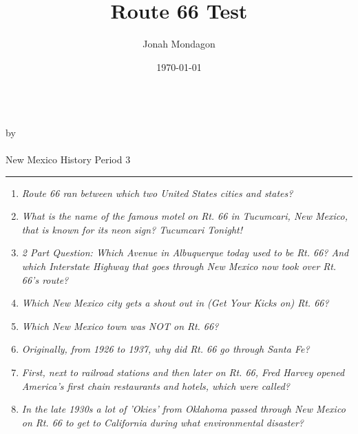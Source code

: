 \documentclass[12pt]{article}
\newcommand{\PutTitle}[1]
{
    \begin{center}
        {\huge\bfseries\thetitle}\\
        by \theauthor\\
        \thedate\\
        #1
    \end{center}
    \hrule
}
\begin{document}
\title{Route 66 Test}
\author{Jonah Mondagon}
\date{\today}
\PutTitle{New Mexico History Period 3}

\pagestyle{headings}

\doublespacing

\begin{enumerate}
    \item{\textit{Route 66 ran between which two United States cities and states?}}
        \begin{addmargin}[24pt]{0in}
        \end{addmargin}
    \item{\textit{What is the name of the famous motel on Rt. 66 in Tucumcari, New Mexico, that is known for its neon sign? Tucumcari Tonight!}}
        \begin{addmargin}[24pt]{0in}
        \end{addmargin}
    \item{\textit{2 Part Question: Which Avenue in Albuquerque today used to be Rt. 66? And which Interstate Highway that goes through New Mexico now took over Rt. 66's route?}}
        \begin{addmargin}[24pt]{0in}
        \end{addmargin}
    \item{\textit{Which New Mexico city gets a shout out in (Get Your Kicks on) Rt. 66?}}
        \begin{addmargin}[24pt]{0in}
        \end{addmargin}
    \item{\textit{Which New Mexico town was NOT on Rt. 66?}}
        \begin{addmargin}[24pt]{0in}
        \end{addmargin}
    \item{\textit{Originally, from 1926 to 1937, why did Rt. 66 go through Santa Fe?}}
        \begin{addmargin}[24pt]{0in}
        \end{addmargin}
    \item{\textit{First, next to railroad stations and then later on Rt. 66, Fred Harvey opened America's first chain restaurants and hotels, which were called?}}
        \begin{addmargin}[24pt]{0in}
        \end{addmargin}
    \item{\textit{In the late 1930s a lot of 'Okies' from Oklahoma passed through New Mexico on Rt. 66 to get to California during what environmental disaster?}}
        \begin{addmargin}[24pt]{0in}

\end{addmargin}
\end{enumerate}
\end{document}
